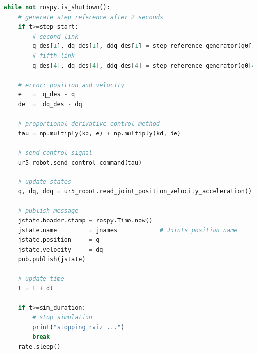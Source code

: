 \begin{lstlisting}[language=Python,caption={Rosnode to move the second and fifth joint of UR5 robot with the requirement motion of activity 1.4.}, label={lst:joint_PD_control_high_gains}]
while not rospy.is_shutdown():
    # generate step reference after 2 seconds
    if t>=step_start:
        # second link
        q_des[1], dq_des[1], ddq_des[1] = step_reference_generator(q0[1], -0.4)
        # fifth link
        q_des[4], dq_des[4], ddq_des[4] = step_reference_generator(q0[4], 0.5)

    # error: position and velocity
    e 	=  q_des - q
    de 	=  dq_des - dq    

    # proportional-derivative control method
    tau = np.multiply(kp, e) + np.multiply(kd, de)
    
    # send control signal
    ur5_robot.send_control_command(tau)
    
    # update states
    q, dq, ddq = ur5_robot.read_joint_position_velocity_acceleration()

    # publish message
    jstate.header.stamp = rospy.Time.now()
    jstate.name 		= jnames			# Joints position name
    jstate.position 	= q
    jstate.velocity 	= dq
    pub.publish(jstate)

    # update time
    t = t + dt

    if t>=sim_duration:
        # stop simulation
        print("stopping rviz ...")
        break
    rate.sleep()
\end{lstlisting}

